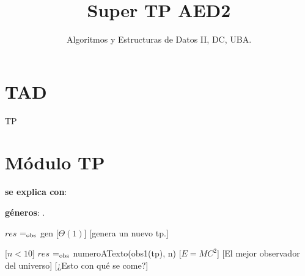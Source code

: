 \documentclass[10pt, a4paper]{article}
\author{Algoritmos y Estructuras de Datos II, DC, UBA.}
\date{}
\title{Super TP AED2}
\begin{document}
\maketitle

\section{TAD }

\begin{tad}{TP}

\tadObservadores
{}


\tadAxiomas
{}
\end{tad}

\section{Módulo TP}

\begin{Interfaz}

  \textbf{se explica con}: 

  \textbf{géneros}: .


  {$res$ $=_{\mathrm{obs}}$ gen}%
  [$\Theta(1)$]
  [genera un nuevo tp.]

  [$n < 10$]
  {$res$ $=_{\mathrm{obs}}$ numeroATexto(obs1(tp), n)}
  [$E = MC^2$]
  [El mejor observador del universo]
  [¿Esto con qué se come?]

\end{Interfaz}
\end{document}
